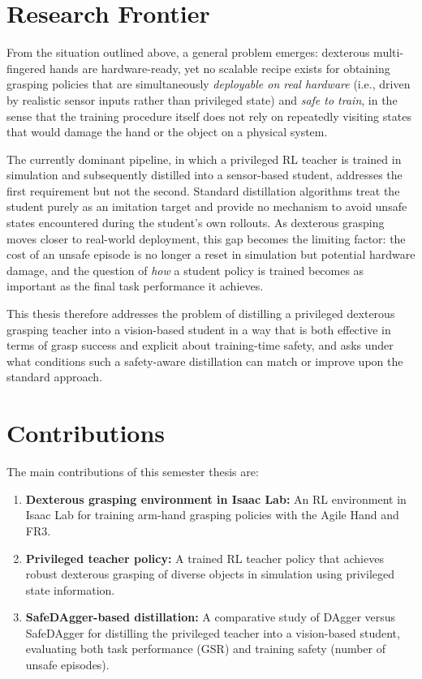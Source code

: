 \section{Research Frontier}%
\label{sec:problem_statement}%

From the situation outlined above, a general problem emerges: dexterous multi-fingered hands are hardware-ready, yet no scalable recipe exists for obtaining grasping policies that are simultaneously \emph{deployable on real hardware} (i.e., driven by realistic sensor inputs rather than privileged state) and \emph{safe to train}, in the sense that the training procedure itself does not rely on repeatedly visiting states that would damage the hand or the object on a physical system.

The currently dominant pipeline, in which a privileged \ac{RL} teacher is trained in simulation and subsequently distilled into a sensor-based student, addresses the first requirement but not the second.
Standard distillation algorithms treat the student purely as an imitation target and provide no mechanism to avoid unsafe states encountered during the student's own rollouts.
As dexterous grasping moves closer to real-world deployment, this gap becomes the limiting factor: the cost of an unsafe episode is no longer a reset in simulation but potential hardware damage, and the question of \emph{how} a student policy is trained becomes as important as the final task performance it achieves.

This thesis therefore addresses the problem of distilling a privileged dexterous grasping teacher into a vision-based student in a way that is both effective in terms of grasp success and explicit about training-time safety, and asks under what conditions such a safety-aware distillation can match or improve upon the standard approach.

\section{Contributions}%
\label{sec:contributions}%

The main contributions of this semester thesis are:

\begin{enumerate}
    \item \textbf{Dexterous grasping environment in Isaac Lab:} An RL environment in Isaac Lab for training arm-hand grasping policies with the Agile Hand and \ac{FR3}.
    \item \textbf{Privileged teacher policy:} A trained RL teacher policy that achieves robust dexterous grasping of diverse objects in simulation using privileged state information.
    \item \textbf{SafeDAgger-based distillation:} A comparative study of DAgger versus SafeDAgger for distilling the privileged teacher into a vision-based student, evaluating both task performance (\ac{GSR}) and training safety (number of unsafe episodes).
\end{enumerate}

